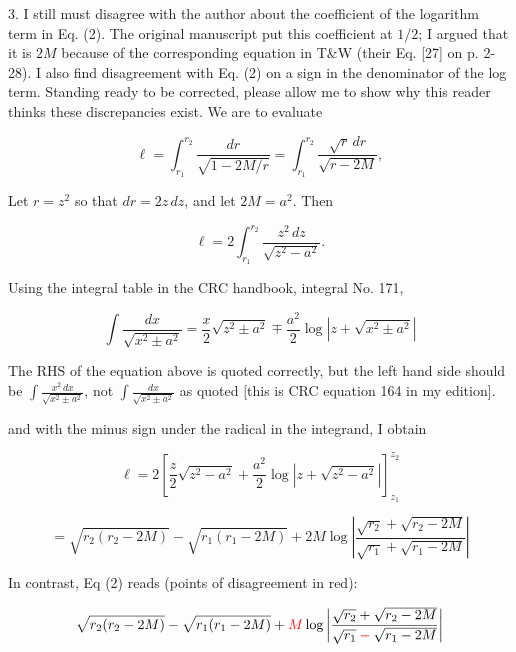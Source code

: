 \documentclass[12pt]{article}
\begin{document}
3. I still must disagree with the author about the coefficient of the
logarithm term in Eq. (2).  The original manuscript put this
coefficient at $1/2$; I argued that it is $2M$ because of the
corresponding equation in T\&W (their Eq. [27] on p. 2-28).  I also
find disagreement with Eq. (2) on a sign in the denominator of the log
term.  Standing ready to be corrected, please allow me to show why
this reader thinks these discrepancies exist.  We are to evaluate

\[
\ell=\int_{r_1}^{r_2}\frac{dr}{\sqrt{1-2M/r}} =
\int_{r_1}^{r_2}\frac{\sqrt{r}\,dr}{\sqrt{r-2M}},
\]

Let $r=z^2$ so that $dr=2z\,dz$, and let $2M=a^2$.  Then 

\[
\ell=2\int_{r_1}^{r_2} \frac{z^2\,dz}{\sqrt{z^2-a^2}}.
\]

 Using the integral table in the CRC handbook, integral No. 171,

\[
\int\frac{dx}{\sqrt{x^2\pm a^2}}=\frac{x}{2} \sqrt{z^2\pm a^2}
\mp \frac{a^2}{2}\log\left| z+\sqrt{x^2\pm a^2}\right|
\]


{\color{blue} The RHS of the equation above is quoted correctly, but
  the left hand side should be $\int\frac{x^2\,dx}{\sqrt{x^2\pm
      a^2}}$, not $\int\frac{dx}{\sqrt{x^2\pm a^2}}$ as quoted [this
    is CRC equation 164 in my edition].  }


 and with the minus sign under the radical in the integrand, I obtain

\[
\ell = 2\left[
  \frac{z}{2}\sqrt{z^2-a^2} + \frac{a^2}{2}\log\left|z+\sqrt{z^2-a^2}\right|
  \right]_{z_1}^{z_2}
\]

\[
=
\sqrt{r_2(r_2-2M)}-\sqrt{r_1(r_1-2M)} + 2M\log\left|
\frac{\sqrt{r_2}+\sqrt{r_2-2M}}{\sqrt{r_1}+\sqrt{r_1-2M}}\right|
\]


In contrast, Eq (2) reads (points of disagreement in red):


\[
\sqrt{r_2(r_2-2M)}-\sqrt{r_1(r_1-2M)} 
+\color{red}M
\color{black}\log\left|
\frac{\sqrt{r_2}+\sqrt{r_2-2M}}{\sqrt{r_1}
  \color{red}-
  \color{black}\sqrt{r_1-2M}}\right|
\]
\end{document}
